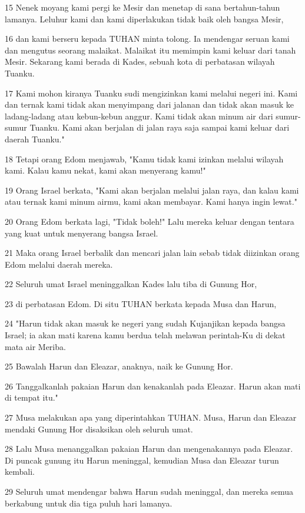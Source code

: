 \par 15 Nenek moyang kami pergi ke Mesir dan menetap di sana bertahun-tahun lamanya. Leluhur kami dan kami diperlakukan tidak baik oleh bangsa Mesir,
\par 16 dan kami berseru kepada TUHAN minta tolong. Ia mendengar seruan kami dan mengutus seorang malaikat. Malaikat itu memimpin kami keluar dari tanah Mesir. Sekarang kami berada di Kades, sebuah kota di perbatasan wilayah Tuanku.
\par 17 Kami mohon kiranya Tuanku sudi mengizinkan kami melalui negeri ini. Kami dan ternak kami tidak akan menyimpang dari jalanan dan tidak akan masuk ke ladang-ladang atau kebun-kebun anggur. Kami tidak akan minum air dari sumur-sumur Tuanku. Kami akan berjalan di jalan raya saja sampai kami keluar dari daerah Tuanku."
\par 18 Tetapi orang Edom menjawab, "Kamu tidak kami izinkan melalui wilayah kami. Kalau kamu nekat, kami akan menyerang kamu!"
\par 19 Orang Israel berkata, "Kami akan berjalan melalui jalan raya, dan kalau kami atau ternak kami minum airmu, kami akan membayar. Kami hanya ingin lewat."
\par 20 Orang Edom berkata lagi, "Tidak boleh!" Lalu mereka keluar dengan tentara yang kuat untuk menyerang bangsa Israel.
\par 21 Maka orang Israel berbalik dan mencari jalan lain sebab tidak diizinkan orang Edom melalui daerah mereka.
\par 22 Seluruh umat Israel meninggalkan Kades lalu tiba di Gunung Hor,
\par 23 di perbatasan Edom. Di situ TUHAN berkata kepada Musa dan Harun,
\par 24 "Harun tidak akan masuk ke negeri yang sudah Kujanjikan kepada bangsa Israel; ia akan mati karena kamu berdua telah melawan perintah-Ku di dekat mata air Meriba.
\par 25 Bawalah Harun dan Eleazar, anaknya, naik ke Gunung Hor.
\par 26 Tanggalkanlah pakaian Harun dan kenakanlah pada Eleazar. Harun akan mati di tempat itu."
\par 27 Musa melakukan apa yang diperintahkan TUHAN. Musa, Harun dan Eleazar mendaki Gunung Hor disaksikan oleh seluruh umat.
\par 28 Lalu Musa menanggalkan pakaian Harun dan mengenakannya pada Eleazar. Di puncak gunung itu Harun meninggal, kemudian Musa dan Eleazar turun kembali.
\par 29 Seluruh umat mendengar bahwa Harun sudah meninggal, dan mereka semua berkabung untuk dia tiga puluh hari lamanya.

